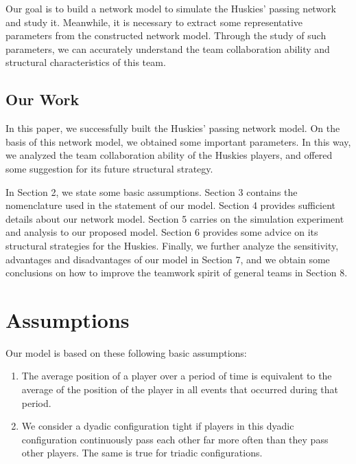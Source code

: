 \documentclass{mcmthesis}
\begin{document}
	Our goal is to build a network model to simulate the Huskies' passing network and study it.  Meanwhile, it is necessary to extract some representative parameters from the constructed network model.  Through the study of such parameters, we can accurately understand the team collaboration ability and structural characteristics of this team.
\subsection{Our Work}
	In this paper, we successfully built the Huskies' passing network model.  On the basis of this network model, we obtained some important parameters. In this way, we analyzed the team collaboration ability of the Huskies players, and offered some suggestion for its future structural strategy.

	In Section 2, we state some basic assumptions.  Section 3 contains the nomenclature used in the statement of our model.  Section 4 provides sufficient details about our network model.  Section 5 carries on the simulation experiment and analysis to our proposed model.  Section 6 provides some advice on its structural strategies for the Huskies.  Finally, we further analyze the sensitivity, advantages and disadvantages of our model in Section 7, and we obtain some conclusions on how to improve the teamwork spirit of general teams in Section 8.
\section{Assumptions}
	Our model is based on these following basic assumptions:
	\begin{enumerate}
		\item The average position of a player over a period of time is equivalent to the average of the position of the player in all events that occurred during that period.
		\item We consider a dyadic configuration tight if players in this dyadic configuration continuously pass each other far more often than they pass other players.  The same is true for triadic configurations.
	\end{enumerate}
\end{document}
